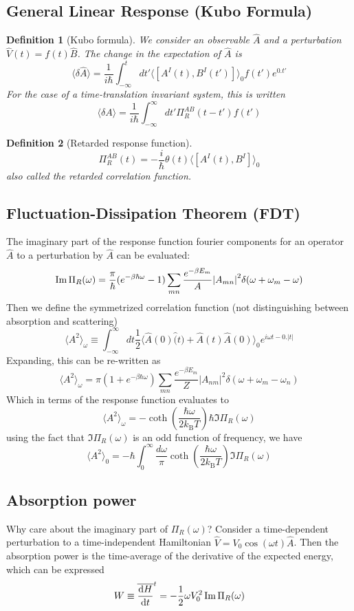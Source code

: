 \documentclass[10pt]{article}
\newcommand{\kb}{k_{\text{B}}}
\newtheorem*{defn}{Definition}
\begin{document}
\subsection{General Linear Response (Kubo Formula)}
\begin{defn}[Kubo formula]
We consider an observable $\hat A$ and a perturbation $\hat V(t) = f(t)\hat B$. The change in the expectation of $\hat A$ is
$$
\langle \delta \hat A \rangle = \frac{1}{i\hbar} \int_{-\infty}^t dt' \langle [A^I(t), B^I(t')]\rangle_0f(t')e^{0.t'}
$$
For the case of a time-translation invariant system, this is written
$$
\langle \delta A \rangle  = \frac{1}{i\hbar}\int_{-\infty}^\infty dt' \Pi^{AB}_R(t-t')f(t')
$$
\end{defn}
\begin{defn}[Retarded response function]
$$
\Pi^{AB}_R(t) =-\frac{i}{\hbar} \theta(t)\langle [A^I(t), B^I]\rangle_0
$$
also called the retarded correlation function.
\end{defn}

\subsection{Fluctuation-Dissipation Theorem (FDT)}
The imaginary part of the response function fourier components for an operator $\hat A$ to a perturbation by $\hat A$ can be evaluated:
$$
\Im \Pi_R(\omega) = \frac{\pi}{\hbar}(e^{-\beta \hbar \omega}-1)\sum_{mn}\frac{e^{-\beta E_m}}{A}\qty|A_{mn}|^2 \delta(\omega+\omega_m-\omega)
$$
Then we define the symmetrized correlation function (not distinguishing between absorption and scattering)
$$
\langle A^2 \rangle_\omega \equiv \int_{-\infty}^\infty dt \frac{1}{2} \langle \hat A(0) \hat (t) + \hat A(t) \hat A(0) \rangle_0 e^{i\omega t - 0.|t|}
$$
Expanding, this can be re-written as
$$
\langle A^2 \rangle_{\omega} = \pi (1+e^{-\beta \hbar \omega})\sum_{mn} \frac{e^{-\beta E_m}}{Z}|A_{nm}|^2\delta(\omega + \omega_m - \omega_n)
$$
Which in terms of the response function evaluates to 
$$
\langle A^2 \rangle_\omega = -\coth(\frac{\hbar \omega}{2\kb T})\hbar \Im \Pi_R(\omega)
$$
using the fact that $\Im \Pi_R(\omega)$ is an odd function of frequency, we have
$$
\langle A^2 \rangle_{0} = -\hbar \int_0^\infty \frac{d\omega}{\pi}\coth(\frac{\hbar \omega}{2\kb T})\Im \Pi_R(\omega)
$$

\subsection{Absorption power}
Why care about the imaginary part of $\Pi_R(\omega)$? Consider a time-dependent perturbation to a time-independent Hamiltonian $\hat V = V_0 \cos(\omega t)\hat A$. Then the absorption power is the time-average of the derivative of the expected energy, which can be expressed
$$
W \equiv \overline{\dv{H}{t}}^t = -\frac{1}{2}\omega V_{0}^2 \Im \Pi_R(\omega)
$$
\end{document}
